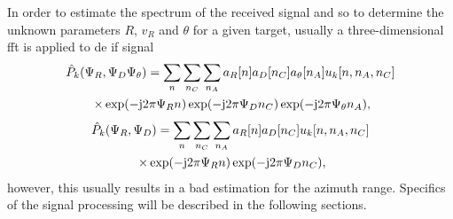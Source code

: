In order to estimate the spectrum of the received signal and so to determine the unknown parameters $R$, $v_R$ and $\theta$ for a given target, usually a three-dimensional \ac{fft} is applied to de \Ac{if} signal
\begin{multline}
\hat{P}_k(\Psi_R,\Psi_D\Psi_\theta) = \sum_{n}\sum_{n_C}\sum_{n_A} a_R[n] a_D[n_C] a_\theta[n_A]u_k[n,n_A,n_C]\\
\times\exp(-\mj2\pi\Psi_Rn)\exp(-\mj2\pi\Psi_Dn_C)\exp(-\mj2\pi\Psi_\theta n_A) \rlap{,}
\end{multline}
\begin{multline}
\hat{P}_k(\Psi_R,\Psi_D) = \sum_{n}\sum_{n_C}\sum_{n_A} a_R[n] a_D[n_C] u_k[n,n_A,n_C]\\
\times\exp(-\mj2\pi\Psi_Rn)\exp(-\mj2\pi\Psi_Dn_C) \rlap{,}
\end{multline}
however, this usually results in a bad estimation for the azimuth range. Specifics of the signal processing will be described in the following sections. 